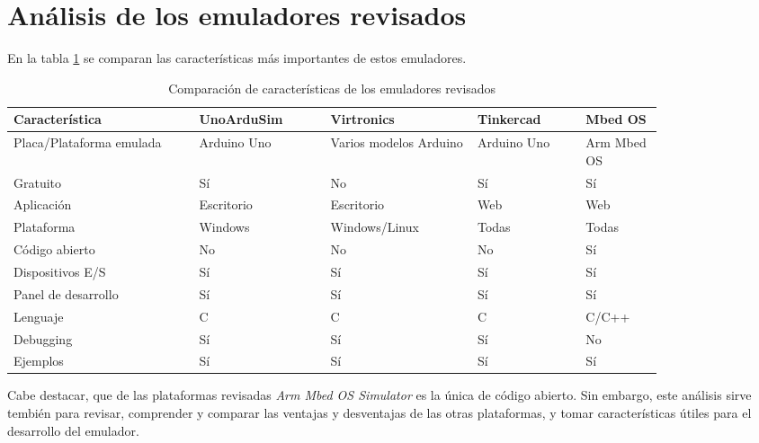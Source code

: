 \section{Análisis de los emuladores revisados}
\label{sec:Análisis de los emuladores revisados}

En la tabla \ref{tab:simuladores} se comparan las características más importantes de estos emuladores. 

\hfill \break
\hfill \break
\hfill \break
\hfill \break
\hfill \break
\hfill \break
\hfill \break
\hfill \break
\hfill \break

\begin{table}[ht]
\centering
\caption[Comparación de características de los emuladores revisados]{Comparación de características de los emuladores revisados}
\begin{tabular}{p{0.24\linewidth} p{0.17\linewidth}  p{0.19\linewidth}  p{0.14\linewidth}  p{0.10\linewidth}}
\toprule
\textbf{Característica} 
& \textbf{UnoArduSim}
& \textbf{Virtronics}
& \textbf{Tinkercad}
& \textbf{Mbed OS}
\\
\midrule
Placa/Plataforma emulada & Arduino Uno & Varios modelos Arduino & Arduino Uno & Arm Mbed OS\\
Gratuito &    Sí & No & Sí & Sí\\
Aplicación & Escritorio & Escritorio & Web & Web\\
Plataforma & Windows & Windows/Linux & Todas & Todas\\
Código abierto & No & No & No & Sí\\
Dispositivos E/S & Sí & Sí & Sí & Sí  \\
Panel de desarrollo & Sí & Sí & Sí & Sí \\
Lenguaje & C & C & C & C/C++\\
Debugging & Sí & Sí & Sí & No\\
Ejemplos & Sí & Sí & Sí & Sí\\
\bottomrule
\hline
\end{tabular}
\label{tab:simuladores}
\end{table}

Cabe destacar, que de las plataformas revisadas \textit{Arm Mbed OS Simulator} es la única de código abierto. Sin embargo, este análisis sirve tembién para revisar, comprender y comparar las ventajas y desventajas de las otras plataformas, y tomar características útiles para el desarrollo del emulador. 

